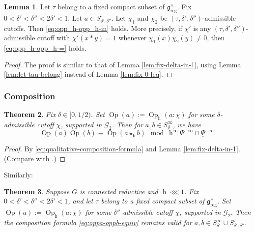 \documentclass[reqno]{amsart}
\DeclareMathOperator{\h}{h}
\DeclareMathOperator{\Opp}{Op}
\DeclareMathOperator{\reg}{reg}
\theoremstyle{plain} \newtheorem{theorem} {Theorem}
\theoremstyle{definition} \newtheorem{definition} [theorem] {Definition}
\theoremstyle{itplain} %
\newtheorem{lemma}[theorem]{Lemma}
\numberwithin{equation}{section}
\numberwithin{theorem}{section}
\begin{document}
\begin{lemma}\label{lem:fix-delta-in-2}
  Let $\tau$ belong to a fixed compact subset of $\mathfrak{g}^\wedge_{\reg}$.  Fix $0 < \delta ' < \delta '' < 2 \delta ' < 1$.  Let $a \in S_{\delta', \delta ''}^{\tau}$.  Let $\chi_1$ and $\chi_2$ be $(\tau, \delta ', \delta '')$-admissible cutoffs.  Then \eqref{eq:opp_h-opp_h-in} holds.  More precisely, if $\chi '$ is any $(\tau, \delta ', \delta '')$-admissible cutoff with $\chi ' (x \ast y) = 1$ whenever $\chi_1(x) \chi_2(y) \neq 0$, then \eqref{eq:opp_h-opp_h-=} holds.
\end{lemma}
\begin{proof}
  The proof is similar to that of Lemma \ref{lem:fix-delta-in-1}, using Lemma \ref{lem:let-tau-belong} instead of Lemma \ref{lem:fix-0-leq}.
\end{proof}



\subsubsection{Composition}

\begin{theorem}\label{thm:composition-formula-quantitative}
  Fix $\delta \in [0,1/2)$.  Set $\Opp(a) := \Opp_{\h}(a:\chi)$ for some $\delta$-admissible cutoff $\chi$, supported in $\mathcal{G}_2$.  Then for $a,b \in S_\delta^\infty$, we have
  \begin{equation}\label{eq:oppa-oppb-equiv}
    \Opp(a) \Opp(b) \equiv \Opp(a \star_{\h} b) \mod{ \h^\infty \Psi^{-\infty} \cap \underline{\Psi }^{-\infty}}.
  \end{equation}
\end{theorem}
\begin{proof}
  By \eqref{eq:qualitative-composition-formula} and Lemma \ref{lem:fix-delta-in-1}.  (Compare with \cite[Thm 10.8, (10.8)]{2020arXiv201202187N}.)
\end{proof}

Similarly:
\begin{theorem}
  Suppose $G$ is connected reductive and $\h \lll 1$.  Fix $0 < \delta  ' < \delta '' < 2 \delta ' < 1$, and let $\tau$ belong to a fixed compact subset of $\mathfrak{g}^\wedge_{\reg}$.   Set $\Opp(a) := \Opp_{\h}(a:\chi)$ for some $\delta''$-admissible cutoff $\chi$, supported in $\mathcal{G}_2$.  Then the composition formula \eqref{eq:oppa-oppb-equiv} remains valid for $a,b \in S_{\delta '}^{\infty} \cup S^{\tau}_{\delta ', \delta ''}$.
\end{theorem}
\end{document}
